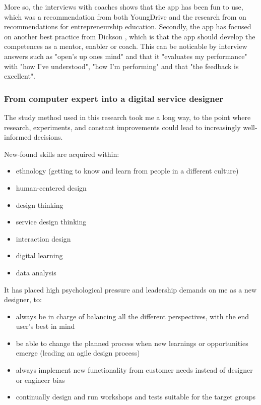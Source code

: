   More so, the interviews with coaches shows that the app has been fun to use, which was a recommendation from both YoungDrive and the research from \cite{dickson} on recommendations for entrepreneurship education. Secondly, the app has focused on another best practice from Dickson \cite{dickson}, which is that the app should develop the competences as a mentor, enabler or coach. This can be noticable by interview answers such as "open's up ones mind" and that it "evaluates my performance" with "how I've understood", "how I'm performing" and that "the feedback is excellent".

  \subsubsection{From computer expert into a digital service designer}
  The study method used in this research took me a long way, to the point where research, experiments, and constant improvements could lead to increasingly well-informed decisions.

  New-found skills are acquired within:
  \begin{itemize}
  \item ethnology (getting to know and learn from people in a different culture)
  \item human-centered design
  \item design thinking
  \item service design thinking
  \item interaction design
  \item digital learning
  \item data analysis
  \end{itemize}

  It has placed high psychological pressure and leadership demands on me as a new designer, to:
  \begin{itemize}
  \item always be in charge of balancing all the different perspectives, with the end user's best in mind
  \item be able to change the planned process when new learnings or opportunities emerge (leading an agile design process)
  \item always implement new functionality from customer needs instead of designer or engineer bias
  \item continually design and run workshops and tests suitable for the target groups
  \end{itemize}

